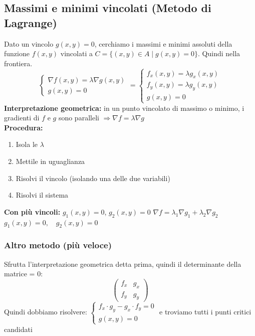 \documentclass[10pt, a4paper]{article}
\begin{document}
    \subsection{Massimi e minimi vincolati (Metodo di Lagrange)}
        Dato un vincolo $g(x, y) = 0 $, cerchiamo i massimi e minimi assoluti della funzione $f(x, y)$ vincolati a $C = \{(x, y) \in A \mid g(x, y) = 0\}$. Quindi nella frontiera.
        \begin{equation*}
            \begin{cases}
                \nabla f(x, y) = \lambda \nabla g(x, y) \\
                g(x, y) = 0
            \end{cases} = \begin{cases}
                f_x(x,y) = \lambda g_x(x,y)\\
                f_y(x,y) = \lambda g_y(x,y)\\
                g(x,y) = 0
            \end{cases}
        \end{equation*}
        \textbf{Interpretazione geometrica:} in un punto vincolato di massimo o minimo, i gradienti di $f$ e $g$ sono paralleli $\Rightarrow \nabla f = \lambda \nabla g$
        \\\textbf{Procedura:}
        \begin{enumerate}
            \item Isola le $\lambda$
            \item Mettile in uguaglianza
            \item Risolvi il vincolo (isolando una delle due variabili)
            \item Risolvi il sistema
        \end{enumerate}
    \textbf{Con più vincoli: } $g_1(x, y) = 0$, $g_2(x, y) = 0$
    $\nabla f = \lambda_1 \nabla g_1 + \lambda_2 \nabla g_2$
    $g_1(x, y) = 0, \quad g_2(x, y) = 0$
    \subsubsection{Altro metodo (più veloce)}
        Sfrutta l'interpretazione geometrica detta prima, quindi il determinante della matrice = 0:
        $$
        \begin{pmatrix}
            f_x & g_x\\
            f_y & g_y
        \end{pmatrix}
        $$
        Quindi dobbiamo risolvere: $\displaystyle \begin{cases}
            f_x\cdot g_y- g_x\cdot f_y=0 \\
            g(x,y)=0
        \end{cases}$ e troviamo tutti i punti critici candidati
\end{document}
